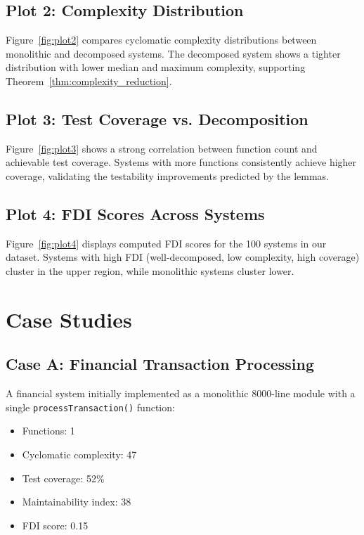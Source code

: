 \documentclass[a4paper,12pt]{article}
\theoremstyle{definition}
\begin{document}
\subsection{Plot 2: Complexity Distribution}

Figure~\ref{fig:plot2} compares cyclomatic complexity distributions between monolithic and decomposed systems. The decomposed system shows a tighter distribution with lower median and maximum complexity, supporting Theorem~\ref{thm:complexity_reduction}.

\subsection{Plot 3: Test Coverage vs. Decomposition}

Figure~\ref{fig:plot3} shows a strong correlation between function count and achievable test coverage. Systems with more functions consistently achieve higher coverage, validating the testability improvements predicted by the lemmas.

\subsection{Plot 4: FDI Scores Across Systems}

Figure~\ref{fig:plot4} displays computed FDI scores for the 100 systems in our dataset. Systems with high FDI (well-decomposed, low complexity, high coverage) cluster in the upper region, while monolithic systems cluster lower.

\section{Case Studies}

\subsection{Case A: Financial Transaction Processing}

A financial system initially implemented as a monolithic 8000-line module with a single \texttt{processTransaction()} function:

\begin{itemize}
	\item Functions: 1
	\item Cyclomatic complexity: 47
	\item Test coverage: 52\%
	\item Maintainability index: 38
	\item FDI score: 0.15
\end{itemize}
\end{document}
